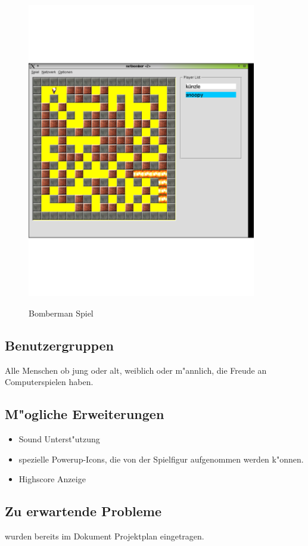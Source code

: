 \begin{figure}[H]
  \begin{center}
    \includegraphics[width=10cm]{./images/spielfeld.pdf} \\
  \end{center}
  \caption{Bomberman Spiel}
\end{figure}

\subsection{Benutzergruppen}
Alle Menschen ob jung oder alt, weiblich oder m"annlich, die Freude an Computerspielen haben.

\subsection{M"ogliche Erweiterungen}
\begin{itemize}
\item Sound Unterst"utzung
\item spezielle Powerup-Icons, die von der Spielfigur aufgenommen werden k"onnen.
\item Highscore Anzeige
\end{itemize}

\subsection{Zu erwartende Probleme}
wurden bereits im Dokument Projektplan eingetragen.


